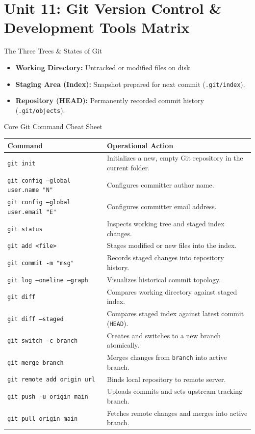 \chapter{Unit 11: Git Version Control \& Development Tools Matrix}

\begin{cheatbox}{The Three Trees \& States of Git}
\begin{itemize}[leftmargin=1.5em]
    \item \textbf{Working Directory:} Untracked or modified files on disk.
    \item \textbf{Staging Area (Index):} Snapshot prepared for next commit (\texttt{.git/index}).
    \item \textbf{Repository (HEAD):} Permanently recorded commit history (\texttt{.git/objects}).
\end{itemize}
\end{cheatbox}

\begin{syntaxbox}{Core Git Command Cheat Sheet}
\begin{tabularx}{\linewidth}{l X}
\toprule
\textbf{Command} & \textbf{Operational Action} \\
\midrule
\texttt{git init} & Initializes a new, empty Git repository in the current folder. \\
\texttt{git config --global user.name "N"} & Configures committer author name. \\
\texttt{git config --global user.email "E"} & Configures committer email address. \\
\texttt{git status} & Inspects working tree and staged index changes. \\
\texttt{git add <file>} & Stages modified or new files into the index. \\
\texttt{git commit -m "msg"} & Records staged changes into repository history. \\
\texttt{git log --oneline --graph} & Visualizes historical commit topology. \\
\texttt{git diff} & Compares working directory against staged index. \\
\texttt{git diff --staged} & Compares staged index against latest commit (\texttt{HEAD}). \\
\texttt{git switch -c branch} & Creates and switches to a new branch atomically. \\
\texttt{git merge branch} & Merges changes from \texttt{branch} into active branch. \\
\texttt{git remote add origin url} & Binds local repository to remote server. \\
\texttt{git push -u origin main} & Uploads commits and sets upstream tracking branch. \\
\texttt{git pull origin main} & Fetches remote changes and merges into active branch. \\
\bottomrule
\end{tabularx}
\end{syntaxbox}

